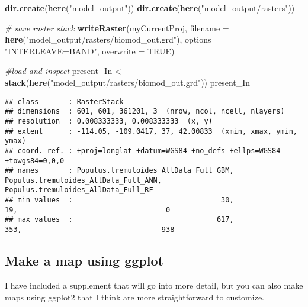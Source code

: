 \documentclass[]{article}
\newenvironment{Shaded}{\begin{snugshade}}{\end{snugshade}}
\newcommand{\KeywordTok}[1]{\textcolor[rgb]{0.13,0.29,0.53}{\textbf{#1}}}
\newcommand{\DataTypeTok}[1]{\textcolor[rgb]{0.13,0.29,0.53}{#1}}
\newcommand{\StringTok}[1]{\textcolor[rgb]{0.31,0.60,0.02}{#1}}
\newcommand{\CommentTok}[1]{\textcolor[rgb]{0.56,0.35,0.01}{\textit{#1}}}
\newcommand{\OtherTok}[1]{\textcolor[rgb]{0.56,0.35,0.01}{#1}}
\newcommand{\NormalTok}[1]{#1}
\begin{document}
\begin{Shaded}
\begin{Highlighting}[]
\KeywordTok{dir.create}\NormalTok{(}\KeywordTok{here}\NormalTok{(}\StringTok{"model_output"}\NormalTok{))}
\KeywordTok{dir.create}\NormalTok{(}\KeywordTok{here}\NormalTok{(}\StringTok{"model_output/rasters"}\NormalTok{))}

\CommentTok{# save raster stack}
\KeywordTok{writeRaster}\NormalTok{(myCurrentProj, }\DataTypeTok{filename =} \KeywordTok{here}\NormalTok{(}\StringTok{"model_output/rasters/biomod_out.grd"}\NormalTok{), }\DataTypeTok{options =} \StringTok{"INTERLEAVE=BAND"}\NormalTok{, }\DataTypeTok{overwrite =} \OtherTok{TRUE}\NormalTok{)}

\CommentTok{#load and inspect}
\NormalTok{present_In <-}\StringTok{ }\KeywordTok{stack}\NormalTok{(}\KeywordTok{here}\NormalTok{(}\StringTok{"model_output/rasters/biomod_out.grd"}\NormalTok{))}
\NormalTok{present_In}
\end{Highlighting}
\end{Shaded}

\begin{verbatim}
## class       : RasterStack 
## dimensions  : 601, 601, 361201, 3  (nrow, ncol, ncell, nlayers)
## resolution  : 0.008333333, 0.008333333  (x, y)
## extent      : -114.05, -109.0417, 37, 42.00833  (xmin, xmax, ymin, ymax)
## coord. ref. : +proj=longlat +datum=WGS84 +no_defs +ellps=WGS84 +towgs84=0,0,0 
## names       : Populus.tremuloides_AllData_Full_GBM, Populus.tremuloides_AllData_Full_ANN, Populus.tremuloides_AllData_Full_RF 
## min values  :                                   30,                                   19,                                   0 
## max values  :                                  617,                                  353,                                 938
\end{verbatim}

\subsection{Make a map using ggplot}\label{make-a-map-using-ggplot}

I have included a supplement that will go into more detail, but you can
also make maps using ggplot2 that I think are more straightforward to
customize.
\end{document}
